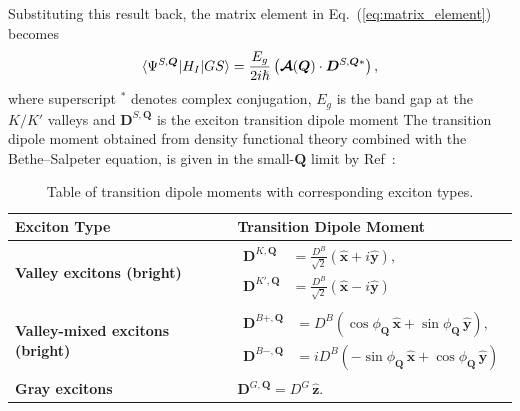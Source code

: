 Substituting this result back, the matrix element in Eq.~(\ref{eq:matrix_element})~\cite{peng2022tailoring, sanchez2024enhanced} becomes
\begin{equation}
\color{G}
\langle\Psi^{S, \boldsymbol{Q}}|H_I|GS\rangle 
=
\frac{E_g}{2i\hslash}
\left(
\boldsymbol{\mathcal{A}}(\boldsymbol{Q})  \cdot 
\boldsymbol{D}^{S, \boldsymbol{Q} *}
\right),
\label{firstmatrixelement}
\end{equation}
where superscript $^*$ denotes complex conjugation, $E_g$ is the band gap at the $K/K'$ valleys and $\boldsymbol{D}^{S, \boldsymbol{Q}}$ is the exciton transition dipole moment The transition dipole moment obtained from density functional theory combined with the Bethe--Salpeter equation, is given in the small-$\boldsymbol{Q}$ limit by Ref~\cite{peng2022tailoring, sanchez2024enhanced}:
\begin{table}[h]
\centering
\caption{Table of transition dipole moments with corresponding exciton types.} 
\label{tab:exciton_dipoles}
\renewcommand{\arraystretch}{1.5} %
\begin{tabular}{ll}
\hline\hline
\textbf{Exciton Type} & \textbf{Transition Dipole Moment} \\ \hline
\textbf{Valley excitons (bright)} & 
$\begin{aligned}
    \boldsymbol{D}^{K, \boldsymbol{Q}} &= \frac{D^B}{\sqrt{2}} (\hat{\boldsymbol{x}}+i\hat{\boldsymbol{y}}), \\
    \boldsymbol{D}^{K', \boldsymbol{Q}} &= \frac{D^B}{\sqrt{2}} (\hat{\boldsymbol{x}}-i\hat{\boldsymbol{y}})
\end{aligned}$ \\ \hline
\textbf{Valley-mixed excitons (bright)} & 
$\begin{aligned}
    \boldsymbol{D}^{B+, \boldsymbol{Q}} &= D^B\left(\cos\phi_{\boldsymbol{Q}}\,\hat{\boldsymbol{x}} + \sin\phi_{\boldsymbol{Q}}\,\hat{\boldsymbol{y}}\right), \\
    \boldsymbol{D}^{B-, \boldsymbol{Q}} &= iD^B \left(-\sin\phi_{\boldsymbol{Q}}\,\hat{\boldsymbol{x}} + \cos\phi_{\boldsymbol{Q}}\,\hat{\boldsymbol{y}}\right)
\end{aligned}$ \label{transitiondipole} \\ \hline
\textbf{Gray excitons} & 
$\boldsymbol{D}^{G, \boldsymbol{Q}} = D^G\,\hat{\boldsymbol{z}}.$ \\ \hline\hline
\end{tabular}
\end{table}

